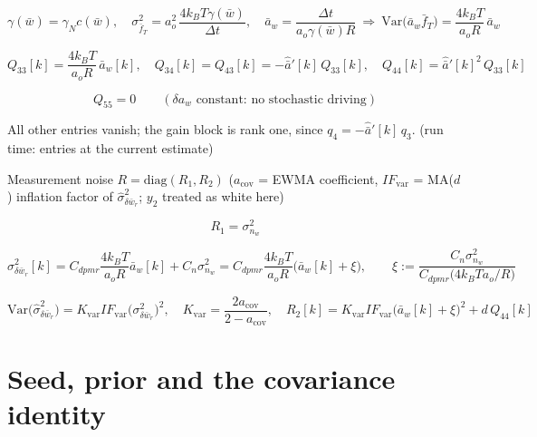 \documentclass[11pt,a4paper,fontset=none]{ctexart}
\begin{document}
\begin{equation*}
\gamma(\bar{w}) = \gamma_N c(\bar{w}),
\quad
\sigma^{2}_{\bar{f}_T} = a_o^{2}\,\frac{4k_BT\gamma(\bar{w})}{\Delta t},
\quad
\bar{a}_w = \frac{\Delta t}{a_o\gamma(\bar{w})R}
\ \Longrightarrow\
\mathrm{Var}\bigl(\bar{a}_w\bar{f}_T\bigr) = \frac{4k_BT}{a_oR}\,\bar{a}_w
\end{equation*}

\begin{equation*}
Q_{33}[k] = \frac{4k_BT}{a_oR}\,\bar{a}_w[k],
\quad
Q_{34}[k] = Q_{43}[k] = -\hat{\bar{a}}'[k]\,Q_{33}[k],
\quad
Q_{44}[k] = \hat{\bar{a}}'[k]^{2}\,Q_{33}[k]
\end{equation*}

\begin{equation*}
Q_{55} = 0 \qquad (\delta a_w \text{ constant: no stochastic driving})
\end{equation*}

All other entries vanish; the gain block is rank one, since
$q_4 = -\hat{\bar{a}}'[k]\,q_3$. (run time: entries at the current estimate)

Measurement noise $R = \mathrm{diag}(R_1, R_2)$ ($a_{\mathrm{cov}}$ = EWMA
coefficient, $IF_{\mathrm{var}}$ = MA($d$) inflation factor of
$\hat{\sigma}^{2}_{\delta\bar{w}_r}$; $y_2$ treated as white here)

\begin{equation*}
R_1 = \sigma^{2}_{n_w}
\end{equation*}

\begin{equation*}
\sigma^{2}_{\delta\bar{w}_r}[k]
  = C_{dpmr}\frac{4k_BT}{a_oR}\bar{a}_w[k] + C_n\sigma^{2}_{n_w}
  = C_{dpmr}\frac{4k_BT}{a_oR}\bigl(\bar{a}_w[k] + \xi\bigr),
\qquad
\xi := \frac{C_n\sigma^{2}_{n_w}}{C_{dpmr}\bigl(4k_BT a_o/R\bigr)}
\end{equation*}

\begin{equation*}
\mathrm{Var}\bigl(\hat{\sigma}^{2}_{\delta\bar{w}_r}\bigr)
  = K_{\mathrm{var}} IF_{\mathrm{var}}
    \bigl(\sigma^{2}_{\delta\bar{w}_r}\bigr)^{2},
\quad
K_{\mathrm{var}} = \frac{2a_{\mathrm{cov}}}{2-a_{\mathrm{cov}}},
\quad
R_2[k] = K_{\mathrm{var}} IF_{\mathrm{var}}
  \bigl(\bar{a}_w[k]+\xi\bigr)^{2} + d\,Q_{44}[k]
\end{equation*}

\section*{Seed, prior and the covariance identity}
\end{document}
